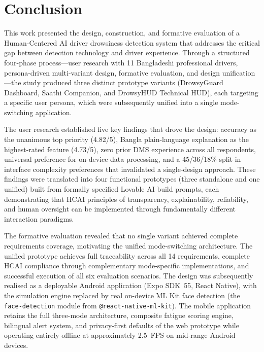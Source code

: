 \documentclass[sigconf]{acmart}
\begin{document}
\section{Conclusion}

This work presented the design, construction, and formative evaluation of a Human-Centered AI driver drowsiness detection system that addresses the critical gap between detection technology and driver experience. Through a structured four-phase process---user research with 11 Bangladeshi professional drivers, persona-driven multi-variant design, formative evaluation, and design unification---the study produced three distinct prototype variants (DrowsyGuard Dashboard, Saathi Companion, and DrowsyHUD Technical HUD), each targeting a specific user persona, which were subsequently unified into a single mode-switching application.

The user research established five key findings that drove the design: accuracy as the unanimous top priority (4.82/5), Bangla plain-language explanation as the highest-rated feature (4.73/5), zero prior DMS experience across all respondents, universal preference for on-device data processing, and a 45/36/18\% split in interface complexity preferences that invalidated a single-design approach. These findings were translated into four functional prototypes (three standalone and one unified) built from formally specified Lovable AI build prompts, each demonstrating that HCAI principles of transparency, explainability, reliability, and human oversight can be implemented through fundamentally different interaction paradigms.

The formative evaluation revealed that no single variant achieved complete requirements coverage, motivating the unified mode-switching architecture. The unified prototype achieves full traceability across all 14 requirements, complete HCAI compliance through complementary mode-specific implementations, and successful execution of all six evaluation scenarios. The design was subsequently realised as a deployable Android application (Expo SDK~55, React Native), with the simulation engine replaced by real on-device ML Kit face detection (the \texttt{face-detection} module from \texttt{@react-native-ml-kit}). The mobile application retains the full three-mode architecture, composite fatigue scoring engine, bilingual alert system, and privacy-first defaults of the web prototype while operating entirely offline at approximately 2.5~FPS on mid-range Android devices.
\end{document}
